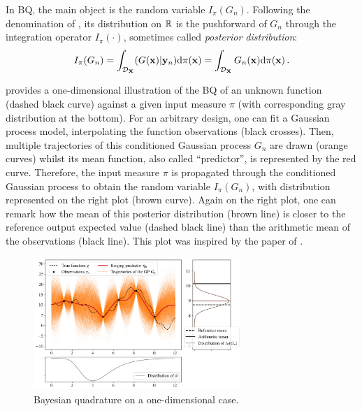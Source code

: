 In BQ, the main object is the random variable $I_{\pi}(G_n)$. 
Following the denomination of \citet{briol_oates_2019}, its distribution on $\mathbb{R}$ is the pushforward of $G_n$ through the integration operator $I_\pi(\cdot)$, sometimes called \emph{posterior distribution}: 
\begin{equation}
    I_{\pi}(G_n) = \int_{\mathcal{D}_{\bf X}} (G({\bf x}) | {\bf y}_n)  \mathrm{d} \pi({\bf x}) = \int_{\mathcal{D}_{\bf X}} G_n({\bf x})  \mathrm{d} \pi({\bf x}) \,.
\label{eq:posterior}
\end{equation}

 provides a one-dimensional illustration of the BQ of an unknown function (dashed black curve) against a given input measure $\pi$ (with corresponding gray distribution at the bottom). 
For an arbitrary design, one can fit a Gaussian process model, interpolating the function observations (black crosses). 
Then, multiple trajectories of this conditioned Gaussian process $G_n$ are drawn (orange curves) whilst its mean function, also called ``predictor'', is represented by the red curve. 
Therefore, the input measure $\pi$ is propagated through the conditioned Gaussian process to obtain the random variable $I_{\pi}(G_n)$, with distribution represented on the right plot (brown curve). 
Again on the right plot, one can remark how the mean of this posterior distribution (brown line) is closer to the reference output expected value (dashed black line) than the arithmetic mean of the observations (black line). 
This plot was inspired by the paper of \cite{husar_duvenaud_2012}.

\begin{figure}[!h]
\begin{center}
    \includegraphics[width=0.7\textwidth]{part2/figures/DCE/numerical_experiments/posterior_distribution_centered.jpg}
    \caption{Bayesian quadrature on a one-dimensional case.}
    \label{fig:bayesian_quad}
\end{center}
\end{figure}

